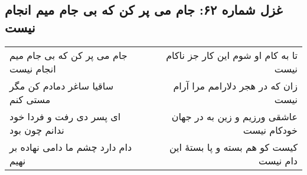 \begin{center}
\section*{غزل شماره ۶۲: جام می پر کن که بی جام میم انجام نیست}
\label{sec:062}
\begin{longtable}{l p{0.5cm} r}
جام می پر کن که بی جام میم انجام نیست
&&
تا به کام او شوم این کار جز ناکام نیست
\\
ساقیا ساغر دمادم کن مگر مستی کنم
&&
زان که در هجر دلارامم مرا آرام نیست
\\
ای پسر دی رفت و فردا خود ندانم چون بود
&&
عاشقی ورزیم و زین به در جهان خودکام نیست
\\
دام دارد چشم ما دامی نهاده بر نهیم
&&
کیست کو هم بسته و پا بستهٔ این دام نیست
\\
\end{longtable}
\end{center}

